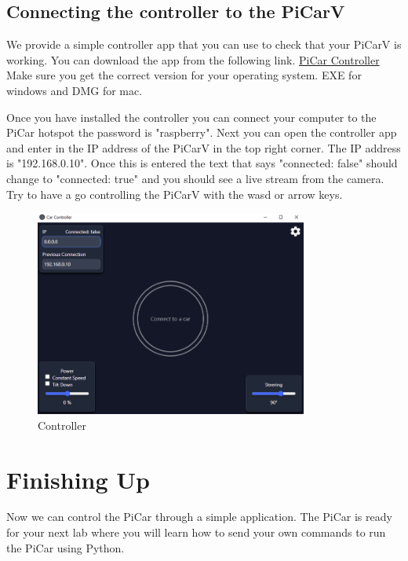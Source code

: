 \documentclass[11pt]{report}
\begin{document}
\section{Connecting the controller to the PiCarV}
We provide a simple controller app that you can use to check that your PiCarV is working. You can download the app from the following link. 
\href{https://github.com/PiCarV/Controller/releases}{PiCar Controller} Make sure you get the correct version for your operating system. EXE for windows and DMG for mac.


Once you have installed the controller you can connect your computer to the PiCar hotspot the password is "raspberry". Next you can open the controller app and enter in the IP address of the PiCarV in the top right corner. The IP address is "192.168.0.10". Once this is entered the text that says "connected: false" should change to "connected: true" and you should see a live stream from the camera. Try to have a go controlling the PiCarV with the wasd or arrow keys. 

\begin{figure}[h]
    \centering
    \includegraphics[width=0.8\textwidth]{controller.png}
    \caption{Controller}
    \label{fig:Controller}
\end{figure}

\chapter{Finishing Up}
Now we can control the PiCar through a simple application. The PiCar is ready for your next lab where you will learn how to send your own commands to run the PiCar using Python.
\end{document}
